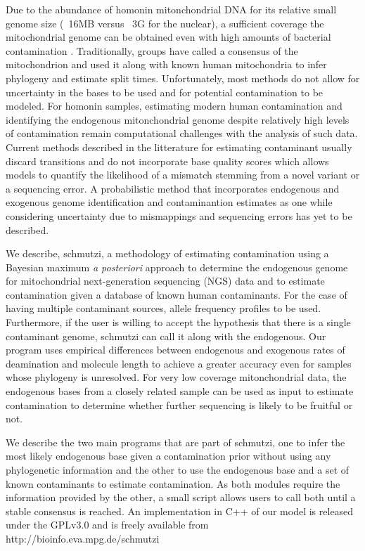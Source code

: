\documentclass[a4paper,12pt]{article}
\begin{document}
Due to the abundance of homonin mitonchondrial DNA for its relative small genome size (~16MB versus ~3G for the nuclear), a sufficient coverage the mitochondrial genome can be obtained even with high amounts of bacterial contamination \cite{}. Traditionally, groups have called a consensus of the mitochondrion and used it along with known human mitochondria to infer phylogeny and estimate split times. Unfortunately, most methods do not allow for uncertainty in the bases to be used and for potential contamination to be modeled. For homonin samples, estimating modern human contamination and identifying the endogenous mitonchondrial genome despite relatively high levels of contamination remain computational challenges with the analysis of such data. Current methods described in the litterature for estimating contaminant usually discard transitions and do not incorporate base quality scores which allows models to quantify the likelihood of a mismatch stemming from a novel variant or a sequencing error. A probabilistic method that incorporates endogenous and exogenous genome identification and contaminantion estimates as one while considering uncertainty due to mismappings and sequencing errors has yet to be described. 


We describe, schmutzi, a methodology of estimating contamination using a Bayesian maximum {\it a posteriori} approach to determine the endogenous genome for mitochondrial next-generation sequencing (NGS) data and to estimate contamination given a database of known human contaminants. For the case of having multiple contaminant sources, allele frequency profiles to be used. Furthermore, if the user is willing to accept the hypothesis that there is a single contaminant genome, schmutzi can call it along with the endogenous. Our program uses empirical differences between endogenous and exogenous rates of deamination and molecule length to achieve a greater accuracy even for samples whose phylogeny is unresolved. For very low coverage mitonchondrial data, the endogenous bases from a closely related sample can be used as input to estimate contamination to determine whether further sequencing is likely to be fruitful or not.

We describe the two main programs that are part of schmutzi, one to infer the most likely endogenous base given a contamination prior without using any phylogenetic information and the other to use the endogenous base and a set of known contaminants to estimate contamination. As both modules require the information provided by the other, a small script allows users to call both until a stable consensus is reached. An implementation in C++ of our model is released under the GPLv3.0 and is freely available from http://bioinfo.eva.mpg.de/schmutzi
\end{document}
